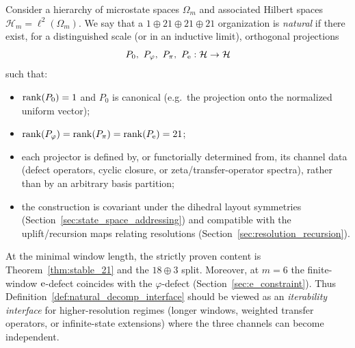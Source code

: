 \begin{definition}
\label{def:natural_decomp_interface}
Consider a hierarchy of microstate spaces $\Omega_m$ and associated Hilbert spaces $\mathcal{H}_m=\ell^2(\Omega_m)$.
We say that a $1\oplus 21\oplus 21\oplus 21$ organization is \emph{natural} if there exist, for a distinguished scale (or in an inductive limit), orthogonal projections
\[
P_0,\ P_\varphi,\ P_\pi,\ P_{\e}:\mathcal{H}\to\mathcal{H}
\]
such that:
\begin{itemize}
\item $\operatorname{rank}(P_0)=1$ and $P_0$ is canonical (e.g.\ the projection onto the normalized uniform vector);
\item $\operatorname{rank}(P_\varphi)=\operatorname{rank}(P_\pi)=\operatorname{rank}(P_{\mathrm{e}})=21$;
\item each projector is defined by, or functorially determined from, its channel data (defect operators, cyclic closure, or zeta/transfer-operator spectra), rather than by an arbitrary basis partition;
\item the construction is covariant under the dihedral layout symmetries (Section~\ref{sec:state_space_addressing}) and compatible with the uplift/recursion maps relating resolutions (Section~\ref{sec:resolution_recursion}).
\end{itemize}
\end{definition}

\begin{remark}
At the minimal window length, the strictly proven content is Theorem~\ref{thm:stable_21} and the $18\oplus 3$ split.
Moreover, at $m=6$ the finite-window $\mathrm{e}$-defect coincides with the $\varphi$-defect (Section~\ref{sec:e_constraint}).
Thus Definition~\ref{def:natural_decomp_interface} should be viewed as an \emph{iterability interface} for higher-resolution regimes (longer windows, weighted transfer operators, or infinite-state extensions) where the three channels can become independent.
\end{remark}


